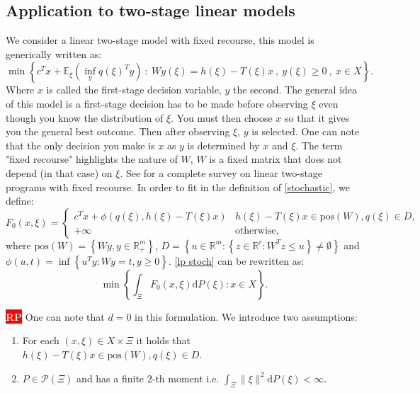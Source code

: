 \documentclass{amsart}
\newcommand{\nb}[3]{
		{\colorbox{#2}{\bfseries\sffamily\tiny\textcolor{white}{#1}}}
		{\textcolor{#2}{\text{$\blacktriangleright$}{\textcolor{#2}{#3}}\text{$\blacktriangleleft$}}}}
\newcommand{\rp}[1]{\nb{RP}{red}{#1}}
\newcommand{\RR}{\mathbb{R}}
\begin{document}
\subsection{Application to two-stage linear models}\label{two stage}
We consider a linear two-stage model with fixed recourse, this model is generically written as: 
\begin{equation}\label{lp stoch}
    \min\left\{c^Tx + \mathbb{E}_\xi\left(\inf_y q\left(\xi\right)^Ty \right)\: :\: Wy\left(\xi\right)=h\left(\xi\right)-T\left(\xi\right)x\:,\: y\left(\xi\right)\geq0\:,\: x\in X \right\}.
\end{equation}
Where $x$ is called the first-stage decision variable, $y$ the second. The general idea of this model is a first-stage decision has to be made before observing $\xi$ even though you know the distribution of $\xi$. You must then choose $x$ so that it gives you the general best outcome. Then after observing $\xi$, $y$ is selected. One can note that the only decision you make is $x$ as $y$ is determined by $x$ and $\xi$. The term "fixed recourse" highlights the nature of $W$, $W$ is a fixed matrix that does not depend (in that case) on $\xi$. See \cite{wets_stochastic_1974} for a complete survey on linear two-stage programs with fixed recourse. In order to fit in the definition of  \ref{stochastic}, we define:
$$
F_0\left(x,\xi\right)=\begin{cases} 
  c^Tx + \phi\left(q\left(\xi\right), h\left(\xi\right) -T\left(\xi\right)x\right) & h\left(\xi\right)-     T\left(\xi\right)x \in \text{pos}\left(W\right), q\left(\xi\right) \in D, \\
  +\infty & \text{otherwise},
\end{cases}
$$
where $\text{pos}(W)=\left\{Wy, y\in\RR_+^m\right\}$, $D=\left\{u\in\RR^m:\left\{z\in\RR^r:W^Tz \leq u\right\}\ne \emptyset\right\}$ and $\phi\left(u,t\right)=\inf\left\{ u^Ty : Wy=t, y\geq0\right\}$. \ref{lp stoch} can be rewritten as:
\begin{equation}
    \min\left\{\int_\Xi F_0\left(x,\xi\right)\text{d}P\left(\xi\right): x\in X\right\}. 
\end{equation}
\rp{i will write down a proof later as it does not appear on the article}
One can note that $d=0$ in this formulation. We introduce two assumptions: 
\begin{enumerate}[label=(A\arabic*)]
    \item\label{h1} For each $\left(x,\xi\right)\in X\times \Xi$ it holds that $h\left(\xi\right)- T\left(\xi\right)x\in \text{pos}\left(W\right), q\left(\xi\right) \in D$.
    \item\label{h2} $P\in\mathcal{P}\left(\Xi\right)$ and has a finite $2$-th moment i.e. $\int_\Xi \lVert \xi\rVert^2\text{d}P\left(\xi\right) < \infty$.
\end{enumerate}
\end{document}
